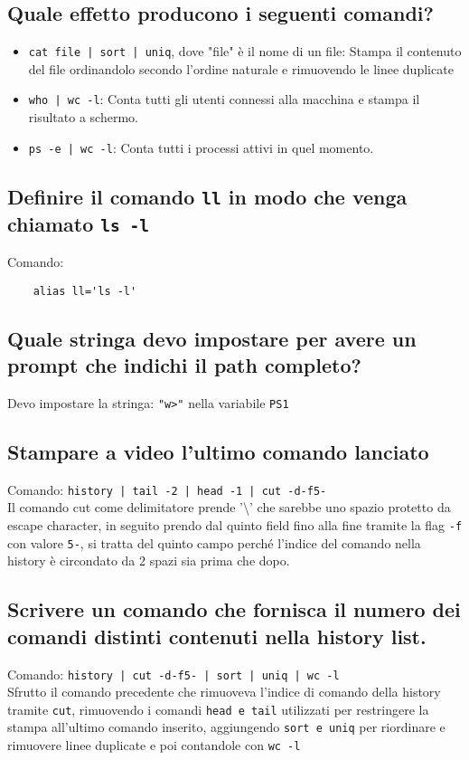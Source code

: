 \documentclass{article}
\begin{document}
\subsection{Quale effetto producono i seguenti comandi? }
\begin{itemize}
    \item \texttt{cat file | sort | uniq}, dove "file" è il nome di un file: Stampa il contenuto del file ordinandolo secondo l'ordine naturale
    e rimuovendo le linee duplicate
    \item \texttt{who | wc -l}: Conta tutti gli utenti connessi alla macchina e stampa il risultato a schermo.
    \item \texttt{ps -e | wc -l}: Conta tutti i processi attivi in quel momento.
\end{itemize}

\subsection{Definire il comando \texttt{ll} in modo che venga chiamato \texttt{ls -l}}
Comando:
\begin{verbatim}
    alias ll='ls -l'
\end{verbatim}

\subsection{Quale stringa devo impostare per avere un prompt che indichi il path completo?}
Devo impostare la stringa: \texttt{"w>"} nella variabile \texttt{PS1}

\subsection{Stampare a video l'ultimo comando lanciato}
Comando: \texttt{history | tail -2 | head -1 | cut -d\space -f5-}\\
Il comando cut come delimitatore prende '\textbackslash\space' che sarebbe uno spazio protetto da escape character,
in seguito prendo dal quinto field fino alla fine tramite la flag \texttt{-f} con valore \texttt{5-}, 
si tratta del quinto campo perché l'indice del comando nella history è circondato da 2 spazi sia prima che dopo.

\subsection{Scrivere un comando che fornisca il numero dei comandi distinti contenuti nella history list.}
Comando: \texttt{history | cut -d\space -f5- | sort | uniq | wc -l}\\
Sfrutto il comando precedente che rimuoveva l'indice di comando della history tramite \texttt{cut}, rimuovendo i comandi \texttt{head e tail}
utilizzati per restringere la stampa all'ultimo comando inserito, aggiungendo \texttt{sort e uniq} per riordinare e rimuovere linee duplicate e 
poi contandole con \texttt{wc -l}
\end{document}
